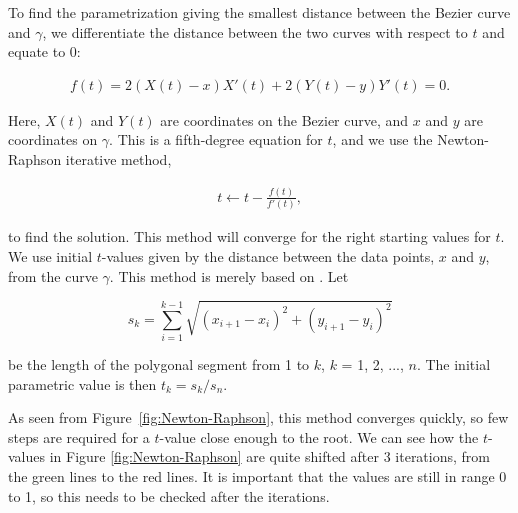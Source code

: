 \documentclass[10pt]{article}
\begin{document}
To find the parametrization giving the smallest distance between the Bezier curve and $\gamma$, we differentiate the distance between the two curves with respect to $t$ and equate to 0:

\begin{align}
f(t) =  2(X(t)-x)X'(t) + 2(Y(t)-y)Y'(t) = 0.
\end{align}

Here, $X(t)$ and $Y(t)$ are coordinates on the Bezier curve, and $x$ and $y$ are coordinates on $\gamma$. This is a fifth-degree equation for $t$, and we use the Newton-Raphson iterative method,

\begin{align}
t \gets t - \frac{f(t)}{f'(t)},
\end{align}

to find the solution. This method will converge for the right starting values for $t$. We use initial $t$-values given by the distance between the data points, $x$ and $y$, from the curve $\gamma$. This method is merely based on \cite{Plass:1983}. Let

\begin{equation}
s_k = \sum_{i=1}^{k-1} \sqrt{(x_{i+1}-x_i)^2 + (y_{i+1}-y_i)^2}
\end{equation}

be the length of the polygonal segment from 1 to $k$, $k$ = 1, 2, ..., $n$. The initial parametric value is then $t_k = s_k/s_n$.

As seen from Figure~\ref{fig:Newton-Raphson}, this method converges quickly, so few steps are required for a $t$-value close enough to the root. We can see how the $t$-values in Figure \ref{fig:Newton-Raphson} are quite shifted after 3 iterations, from the green lines to the red lines. It is important that the values are still in range 0 to 1, so this needs to be checked after the iterations. 
\end{document}
